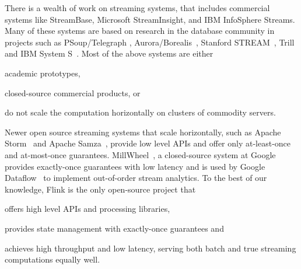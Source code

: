  There is a wealth of work on streaming systems, that includes commercial systems like StreamBase, Microsoft StreamInsight, and IBM InfoSphere Streams. Many of these systems are based on research in the database community in projects such as PSoup/Telegraph \cite{chandrasekaran2003psoup}, Aurora/Borealis~\cite{abadi2005design}, Stanford STREAM~\cite{arasu2004stream}, Trill~\cite{chandramouli2014trill} and IBM System S~\cite{gedik2008spade}. Most of the above systems are either
\begin{inparaenum}[i)]
  \item academic prototypes,
  \item closed-source commercial products, or 
  \item do not scale the computation horizontally on clusters of commodity servers.
\end{inparaenum}
Newer open source streaming systems that scale horizontally, such as Apache Storm~\cite{CUSTOM:web/Storm} and Apache Samza~\cite{CUSTOM:web/Samza}, provide low level APIs and offer only at-least-once and at-most-once guarantees. MillWheel~\cite{akidau2013millwheel}, a closed-source system at Google provides exactly-once guarantees with low latency and is used by Google Dataflow~\cite{akidau2015dataflow} to implement  out-of-order stream analytics. To the best of our knowledge, Flink is the only open-source project that
\begin{inparaenum}[i)]
  \item offers high level APIs and processing libraries,
  \item provides state management with exactly-once guarantees and
  \item achieves high throughput and low latency, serving both batch and true streaming computations equally well.
\end{inparaenum}